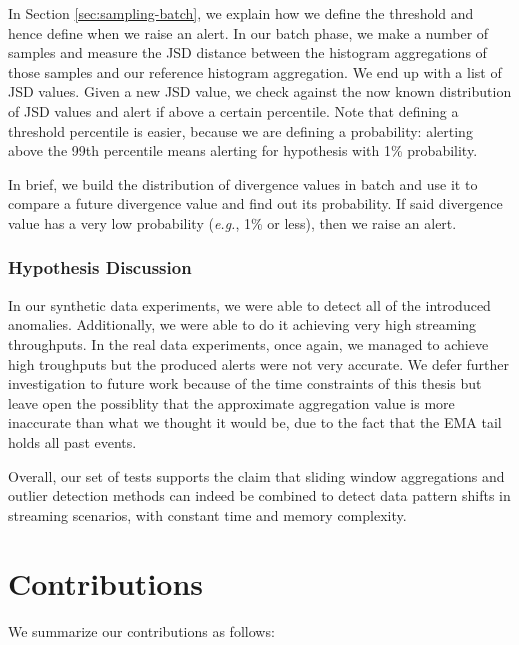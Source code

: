 In Section \ref{sec:sampling-batch}, we explain how we define the threshold and hence define when we raise an alert. In our batch phase, we make a number of samples and measure the JSD distance between the histogram aggregations of those samples and our reference histogram aggregation. We end up with a list of JSD values. Given a new JSD value, we check against the now known distribution of JSD values and alert if above a certain percentile. Note that defining a threshold percentile is easier, because we are defining a probability: alerting above the 99th percentile means alerting for hypothesis with 1\% probability.

In brief, we build the distribution of divergence values in batch and use it to compare a future divergence value and find out its probability. If said divergence value has a very low probability (\textit{e.g.}, 1\% or less), then we raise an alert.

\subsubsection*{Hypothesis Discussion}
In our synthetic data experiments, we were able to detect all of the introduced anomalies. Additionally, we were able to do it achieving very high streaming throughputs. In the real data experiments, once again, we managed to achieve high troughputs but the produced alerts were not very accurate. We defer further investigation to future work because of the time constraints of this thesis but leave open the possiblity that the approximate aggregation value is more inaccurate than what we thought it would be, due to the fact that the EMA tail holds all past events.

Overall, our set of tests supports the claim that sliding window aggregations and outlier detection methods can indeed be combined to detect data pattern shifts in streaming scenarios, with constant time and memory complexity.

\section{Contributions}
We summarize our contributions as follows:

